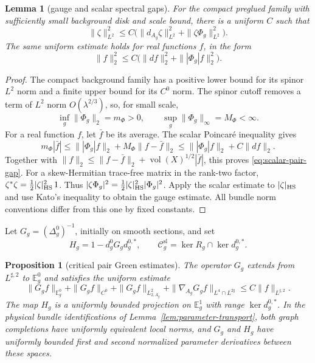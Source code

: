 \documentclass[11pt]{amsart}
\newtheorem{proposition}[theorem]{Proposition}
\newtheorem{lemma}[theorem]{Lemma}
\theoremstyle{definition}
\theoremstyle{remark}
\theoremstyle{plain}
\newcommand{\cC}{\mathcal{C}}
\begin{document}
\begin{lemma}[gauge and scalar spectral gaps]\label{lem:pair-spectral-gap}
For the compact preglued family with sufficiently small background disk and
scale bound, there is a uniform $C$ such that
\[
 \|\zeta\|_{L^2}^2\leq C\bigl(
\|d_{A_g}\zeta\|_{L^2}^2+\|\zeta\Phi_g\|_{L^2}^2\bigr).
\]
The same uniform estimate holds for real functions $f$, in the form
\begin{equation}\label{eq:scalar-pair-gap}
 \|f\|_2^2\leq C\bigl(\|df\|_2^2+
                         \||\Phi_g|f\|_2^2\bigr).
\end{equation}
\end{lemma}
\begin{proof}
The compact background family has a positive lower bound for its spinor
$L^2$ norm and a finite upper bound for its $C^0$ norm.
The spinor cutoff removes a term of $L^2$ norm $O(\lambda^{2/3})$,
so, for small scale,
\[
 \inf_g\|\Phi_g\|_2=m_\Phi>0,\qquad
 \sup_g\|\Phi_g\|_\infty=M_\Phi<\infty.
\]
For a real function $f$, let $\bar f$ be its average.
The scalar Poincar\'e inequality gives
\[
 m_\Phi|\bar f|
 \leq\||\Phi_g|f\|_2+M_\Phi\|f-\bar f\|_2
 \leq\||\Phi_g|f\|_2+C\|df\|_2.
\]
Together with $\|f\|_2\leq\|f-\bar f\|_2+
\operatorname{vol}(X)^{1/2}|\bar f|$, this proves
\eqref{eq:scalar-pair-gap}.
For a skew-Hermitian trace-free matrix in the rank-two factor,
$\zeta^*\zeta=\tfrac12|\zeta|_{\rm HS}^2\,1$.
Thus $|\zeta\Phi_g|^2=\tfrac12|\zeta|_{\rm HS}^2|\Phi_g|^2$.
Apply the scalar estimate to $|\zeta|_{\rm HS}$ and use Kato's
inequality to obtain the gauge estimate.  All bundle norm conventions
differ from this one by fixed constants.
\end{proof}

Let $G_g=(\Delta_g^0)^{-1}$, initially on smooth sections, and set
\begin{equation}\label{eq:horizontal-projection}
 H_g=1-d_g^0G_gd_g^{0,*},\qquad
 \cC_g^{\mathrm{sl}}=\ker R_g\cap\ker d_g^{0,*}.
\end{equation}
\begin{proposition}[critical pair Green estimates]\label{prop:pair-green}
The operator $G_g$ extends from $L^{\sharp,2}$ to $\mathbb E_g^0$ and
satisfies the uniform estimate
\begin{equation}\label{eq:critical-pair-green}
 \|G_gf\|_{\mathbb E_g^0}+\|G_gf\|_{C^0}
 +\|G_gf\|_{L^2_{2,A_g}}
 +\|\nabla_{A_g}G_gf\|_{L^4\cap L^{2\sharp}}
 \leq C\|f\|_{L^{\sharp,2}}.
\end{equation}
The map $H_g$ is a uniformly bounded projection on $\mathbb E_g^1$
with range $\ker d_g^{0,*}$.  In the physical bundle identifications
of Lemma~\ref{lem:parameter-transport}, both graph completions have
uniformly equivalent local norms, and $G_g$ and $H_g$ have uniformly
bounded first and second normalized parameter derivatives between these
spaces.
\end{proposition}
\end{document}
